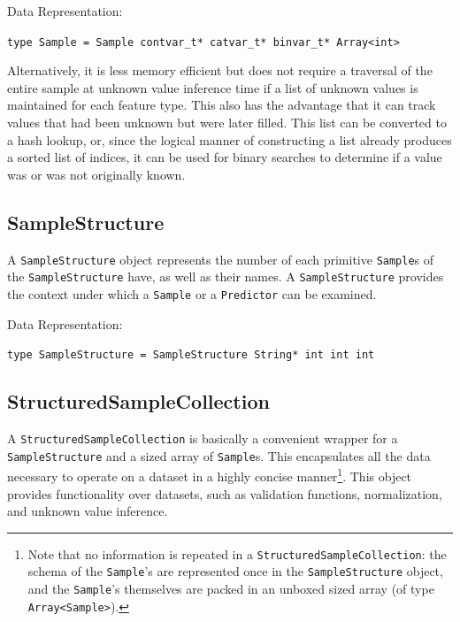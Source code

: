 \documentclass{article}
\begin{document}
\begin{multicols}{2}
\begin{itemize}
\end{itemize}

\par\bigskip

Data Representation:

\texttt{type Sample = Sample contvar\_t* catvar\_t* binvar\_t* Array<int>}

\par
\bigskip

\color{cont}
Alternatively, it is less memory efficient but does not require a traversal of the entire sample at unknown value inference time if a list of unknown values is maintained for each feature type.  This also has the advantage that it can track values that had been unknown but were later filled.  This list can be converted to a hash lookup, or, since the logical manner of constructing a list already produces a sorted list of indices, it can be used for binary searches to determine if a value was or was not originally known.

\color{textcol}


\subsection{SampleStructure}

A \texttt{SampleStructure} object represents the number of each primitive \texttt{Sample}s of the \texttt{SampleStructure} have, as well as their names.  A \texttt{SampleStructure} provides the context under which a \texttt{Sample} or a \texttt{Predictor} can be examined.

\par\bigskip
Data Representation:

\texttt{type SampleStructure = SampleStructure String* int int int}

\par
\bigskip

\subsection{StructuredSampleCollection}

A \texttt{StructuredSampleCollection} is basically a convenient wrapper for a \texttt{SampleStructure} and a sized array of \texttt{Sample}s.  This encapsulates all the data necessary to operate on a dataset in a highly concise manner\footnote{Note that no information is repeated in a \texttt{StructuredSampleCollection}: the schema of the \texttt{Sample}'s are represented once in the \texttt{SampleStructure} object, and the \texttt{Sample}'s themselves are packed in an unboxed sized array (of type \texttt{Array<Sample>}).}.  This object provides functionality over datasets, such as validation functions, normalization, and unknown value inference.


\end{multicols}
\end{document}
